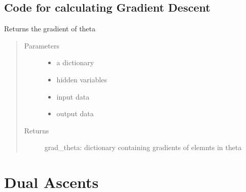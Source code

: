 \documentclass[letterpaper,10pt,english]{sphinxmanual}
\begin{document}
\section{Code for calculating Gradient Descent}
\label{\detokenize{sections/gradient_descents:code-for-calculating-gradient-descent}}\label{\detokenize{sections/gradient_descents:module-utilities.GradientDescents}}

\begin{fulllineitems}
\label{\detokenize{sections/gradient_descents:utilities.GradientDescents.gradient_descent_theta}}
Returns the gradient of theta
\begin{quote}\begin{description}
\item[{Parameters}] \leavevmode\begin{itemize}
\item {} 
 \textendash{} a dictionary

\item {} 
 \textendash{} hidden variables

\item {} 
 \textendash{} input data

\item {} 
 \textendash{} output data

\end{itemize}

\item[{Returns}] \leavevmode
grad\_theta: dictionary containing gradients of elemnts in theta

\end{description}\end{quote}

\end{fulllineitems}



\chapter{Dual Ascents}
\label{\detokenize{sections/dual_ascents:dual-ascents}}\label{\detokenize{sections/dual_ascents:id1}}\label{\detokenize{sections/dual_ascents::doc}}
\end{document}
